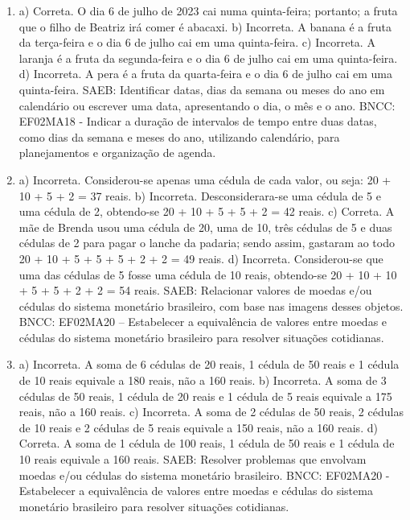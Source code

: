 \begin{enumerate}
\item
a) Correta. O dia 6 de julho de 2023 cai numa quinta-feira; portanto; a
fruta que o filho de Beatriz irá comer é abacaxi.
b) Incorreta. A banana é a fruta da terça-feira e o dia 6 de julho cai
em uma quinta-feira.
c) Incorreta. A laranja é a fruta da segunda-feira e o dia 6 de julho
cai em uma quinta-feira.
d) Incorreta. A pera é a fruta da quarta-feira e o dia 6 de julho cai em uma quinta-feira.
SAEB: Identificar datas, dias da semana ou meses do ano em
calendário ou escrever uma data, apresentando o dia, o mês e o ano.
BNCC: EF02MA18 - Indicar a duração de intervalos de tempo entre duas
datas, como dias da semana e meses do ano, utilizando calendário, para
planejamentos e organização de agenda.

\item
a) Incorreta. Considerou-se apenas uma cédula de cada valor, ou seja: 20 +
10 + 5 + 2 = 37 reais.
b) Incorreta. Desconsiderara-se uma cédula de 5 e uma cédula de 2, obtendo-se
20 + 10 + 5 + 5 + 2 = 42 reais.
c) Correta. A mãe de Brenda usou uma cédula de 20, uma de 10, três
cédulas de 5 e duas cédulas de 2 para pagar o lanche da padaria; sendo
assim, gastaram ao todo 20 + 10 + 5 + 5 + 5 + 2 + 2 = 49 reais.
d) Incorreta. Considerou-se que uma das cédulas de 5 fosse uma cédula de 10
reais, obtendo-se 20 + 10 + 10 + 5 + 5 + 2 + 2 = 54 reais.
SAEB: Relacionar valores de moedas e/ou cédulas do sistema
monetário brasileiro, com base nas imagens desses objetos.
BNCC: EF02MA20 -- Estabelecer a equivalência de valores entre moedas e
cédulas do sistema monetário brasileiro para resolver situações
cotidianas.

\item
a) Incorreta. A soma de 6 cédulas de 20 reais, 1 cédula de 50 reais e 1
cédula de 10 reais equivale a 180 reais, não a 160 reais.
b) Incorreta. A soma de 3 cédulas de 50 reais, 1 cédula de 20 reais e 1
cédula de 5 reais equivale a 175 reais, não a 160 reais.
c) Incorreta. A soma de 2 cédulas de 50 reais, 2 cédulas de 10 reais e 2
cédulas de 5 reais equivale a 150 reais, não a 160 reais.
d) Correta. A soma de 1 cédula de 100 reais, 1 cédula de 50 reais e 1
cédula de 10 reais equivale a 160 reais.
SAEB: Resolver problemas que envolvam moedas e/ou cédulas do
sistema monetário brasileiro. BNCC: EF02MA20 - Estabelecer a
equivalência de valores entre moedas e cédulas do sistema monetário
brasileiro para resolver situações cotidianas.


\end{enumerate}
